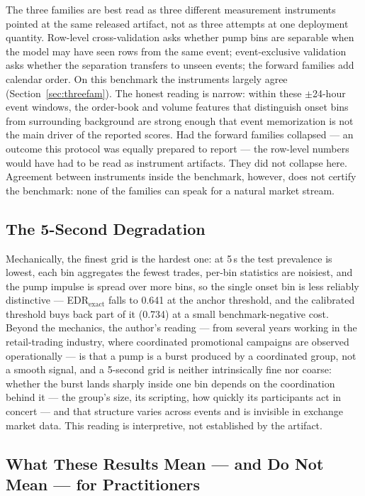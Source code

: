 \documentclass[runningheads]{llncs}
\newif\ifneutralpositionality
\newcommand{\industryclause}{%
\ifneutralpositionality\else{} --- from several years working in the
retail-trading industry, where coordinated promotional campaigns are
observed operationally ---\fi}
\begin{document}
The three families are best read as three different measurement
instruments pointed at the same released artifact, not as three
attempts at one deployment quantity. Row-level cross-validation asks
whether pump bins are separable when the model may have seen rows from
the same event; event-exclusive validation asks whether the separation
transfers to unseen events; the forward families add calendar order. On
this benchmark the instruments largely agree
(Section~\ref{sec:threefam}). The honest reading is narrow: within
these $\pm$24-hour event windows, the order-book and volume features
that distinguish onset bins from surrounding background are strong
enough that event memorization is not the main driver of the reported
scores. Had the forward families collapsed --- an outcome this protocol
was equally prepared to report --- the row-level numbers would have had
to be read as instrument artifacts. They did not collapse here.
Agreement between instruments inside the benchmark, however, does not
certify the benchmark: none of the families can speak for a natural
market stream.

\subsection{The 5-Second Degradation}\label{sec:fivesecond}

Mechanically, the finest grid is the hardest one: at 5\,s the test
prevalence is lowest, each bin aggregates the fewest trades, per-bin
statistics are noisiest, and the pump impulse is spread over more bins,
so the single onset bin is less reliably distinctive ---
EDR$_{\mathrm{exact}}$ falls to 0.641 at the anchor threshold, and the
calibrated threshold buys back part of it (0.734) at a small
benchmark-negative cost. Beyond the mechanics, the author's
reading\industryclause{} is that a pump is a burst produced by a
coordinated group, not a smooth signal, and a 5-second grid is neither
intrinsically fine nor coarse: whether the burst lands sharply inside
one bin depends on the coordination behind it --- the group's size, its
scripting, how quickly its participants act in concert --- and that
structure varies across events and is invisible in exchange market
data. This reading is interpretive, not established by the artifact.

\subsection{What These Results Mean --- and Do Not Mean --- for
Practitioners}\label{sec:practitioners}
\end{document}

